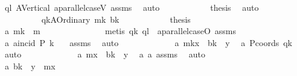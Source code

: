 \begin{isabellebody}
\ ql\ A{}Vertical\ a{}parallel{\isacharunderscore}{\kern0pt}caseV{\isacharparenleft}{\kern0pt}{}{\isacharparenright}{\kern0pt}\ assms{\isacharparenleft}{\kern0pt}{}{\isacharparenright}{\kern0pt}\ \isamarkupfalse%
\ auto\isanewline
\ \ \ \ \ \ \ \ \isamarkupfalse%
\ \isamarkupfalse%
\ {\isacharquery}{\kern0pt}thesis\ \isamarkupfalse%
\ auto\isanewline
\ \ \ \ \ \ \isamarkupfalse%
\isanewline
\ \ \ \ \ \ \ \ \isamarkupfalse%
\ qk{\isacharcolon}{\kern0pt}{\isacharparenleft}{\kern0pt}A{}Ordinary\ mk\ bk{\isacharparenright}{\kern0pt}\isanewline
\ \ \ \ \ \ \ \ \isamarkupfalse%
\ \isamarkupfalse%
\ {\isacharquery}{\kern0pt}thesis\ \isanewline
\ \ \ \ \ \ \ \ \isamarkupfalse%
\ {\isacharminus}{\kern0pt}\isanewline
\ \ \ \ \ \ \ \ \ \ \isamarkupfalse%
\ a{}{\isacharcolon}{\kern0pt}\ {\isachardoublequoteopen}mk\ {\isacharequal}{\kern0pt}\ m{\isachardoublequoteclose}\ \isanewline
\ \ \ \ \ \ \ \ \ \ \ \ \isamarkupfalse%
\ {\isacharparenleft}{\kern0pt}metis\ qk\ ql\ \ a{}parallel{\isacharunderscore}{\kern0pt}caseO\ assms{\isacharparenleft}{\kern0pt}{}{\isacharparenright}{\kern0pt}{\isacharparenright}{\kern0pt}\isanewline
\ \ \ \ \ \ \ \ \ \ \isamarkupfalse%
\ a{}{\isacharcolon}{\kern0pt}\ {\isachardoublequoteopen}a{}incid\ P\ k{\isachardoublequoteclose}\ \ \isamarkupfalse%
\ assms\ \isamarkupfalse%
\ auto\ \isanewline
\ \ \ \ \ \ \ \ \ \ \isamarkupfalse%
\ a{}{\isacharcolon}{\kern0pt}\ {\isachardoublequoteopen}mk{\isacharasterisk}{\kern0pt}x{}\ {\isacharplus}{\kern0pt}\ bk\ {\isacharequal}{\kern0pt}\ y{}{\isachardoublequoteclose}\ \isamarkupfalse%
\ a{}\ Pcoords\ qk\ \isamarkupfalse%
\ auto\ \isanewline
\ \ \ \ \ \ \ \ \ \ \isamarkupfalse%
\ a{}{\isacharcolon}{\kern0pt}\ {\isachardoublequoteopen}m{\isacharasterisk}{\kern0pt}x{}\ {\isacharplus}{\kern0pt}\ bk\ {\isacharequal}{\kern0pt}\ y{}{\isachardoublequoteclose}\ \isamarkupfalse%
\ a{}\ a{}\ assms\ \isamarkupfalse%
\ auto\isanewline
\ \ \ \ \ \ \ \ \ \ \isamarkupfalse%
\ a{}{\isacharcolon}{\kern0pt}\ {\isachardoublequoteopen}bk\ {\isacharequal}{\kern0pt}\ y{}\ {\isacharminus}{\kern0pt}\ m{\isacharasterisk}{\kern0pt}x{}{\isachardoublequoteclose}\ \isamarkupfalse%

\end{isabellebody}
